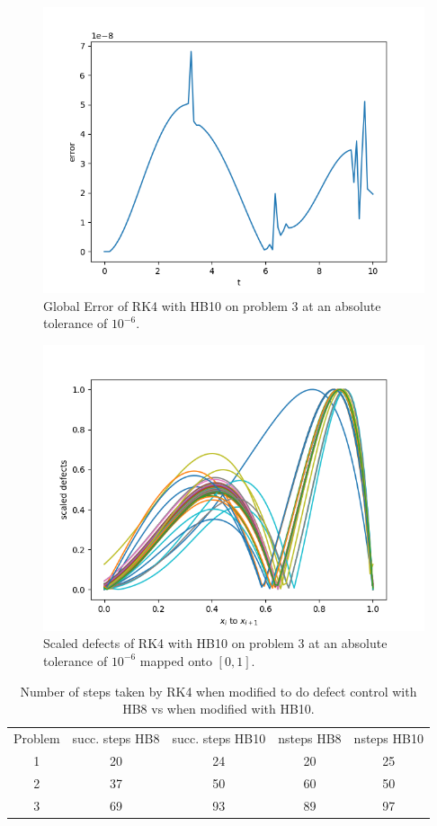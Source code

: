 \begin{figure}[H]
\centering
\includegraphics[width=0.7\linewidth]{./figures/rk4_with_hb10_p3_global_error}
\caption{Global Error of RK4 with HB10 on problem 3 at an absolute tolerance of $10^{-6}$.}
\label{fig:rk4_with_hb10_p3_global_error}
\end{figure}

\begin{figure}[H]
\centering
\includegraphics[width=0.7\linewidth]{./figures/rk4_with_hb10_p3_scaled_defects}
\caption{Scaled defects of RK4 with HB10 on problem 3 at an absolute tolerance of $10^{-6}$ mapped onto $[0, 1]$.}
\label{fig:rk4_with_hb10_p3_scaled_defects}
\end{figure}


\begin{table}[h]
\caption {Number of steps taken by RK4 when modified to do defect control with HB8 vs when modified with HB10.} \label{tab:rk4_with_hb10_nsteps}
\begin{center}
\begin{tabular}{ c c c c c } 
Problem & succ. steps HB8 & succ. steps HB10 & nsteps HB8 & nsteps HB10 \\ 
1       & 20                 &        24          & 20         & 25\\ 
2       & 37                 &        50          & 60         & 50\\
3       & 69                 &        93          & 89         & 97\\
\end{tabular}
\end{center}
\end{table}


